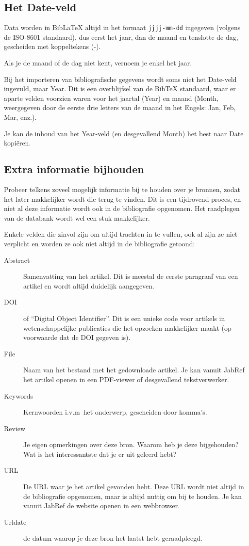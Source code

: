 \subsection{Het Date-veld}%
\label{ssec:het_date_veld}

Data worden in Bib{\LaTeX} altijd in het formaat \texttt{jjjj-mm-dd} ingegeven (volgens de ISO-8601 standaard), dus eerst het jaar, dan de maand en tenslotte de dag, gescheiden met koppeltekens (-).

Als je de maand of de dag niet kent, vernoem je enkel het jaar.

Bij het importeren van bibliografische gegevens wordt soms niet het Date-veld ingevuld, maar Year. Dit is een overblijfsel van de Bib{\TeX} standaard, waar er aparte velden voorzien waren voor het jaartal (Year) en maand (Month, weergegeven door de eerste drie letters van de maand in het Engels: Jan, Feb, Mar, enz.).

Je kan de inhoud van het Year-veld (en desgevallend Month) het best naar Date kopiëren.

\subsection{Extra informatie bijhouden}%
\label{ssec:extra_informatie_bijhouden}

Probeer telkens zoveel mogelijk informatie bij te houden over je bronnen, zodat het later makkelijker wordt die terug te vinden. Dit is een tijdrovend proces, en niet al deze informatie wordt ook in de bibliografie opgenomen. Het raadplegen van de databank wordt wel een stuk makkelijker.

Enkele velden die zinvol zijn om altijd trachten in te vullen, ook al zijn ze niet verplicht en worden ze ook niet altijd in de bibliografie getoond:

\begin{description}
  \item[Abstract] Samenvatting van het artikel. Dit is meestal de eerste paragraaf van een artikel en wordt altijd duidelijk aangegeven.
  \item[DOI] of ``Digital Object Identifier''. Dit is een unieke code voor artikels in wetenschappelijke publicaties die het opzoeken makkelijker maakt (op voorwaarde dat de DOI gegeven is).
  \item[File] Naam van het bestand met het gedownloade artikel. Je kan vanuit JabRef het artikel openen in een PDF-viewer of desgevallend tekstverwerker.
  \item[Keywords] Kernwoorden i.v.m~het onderwerp, gescheiden door komma's.
  \item[Review] Je eigen opmerkingen over deze bron. Waarom heb je deze bijgehouden? Wat is het interessantste dat je er uit geleerd hebt?
  \item[URL] De URL waar je het artikel gevonden hebt. Deze URL wordt niet altijd in de bibliografie opgenomen, maar is altijd nuttig om bij te houden. Je kan vanuit JabRef de website openen in een webbrowser.
  \item[Urldate] de datum waarop je deze bron het laatst hebt geraadpleegd.
\end{description}

